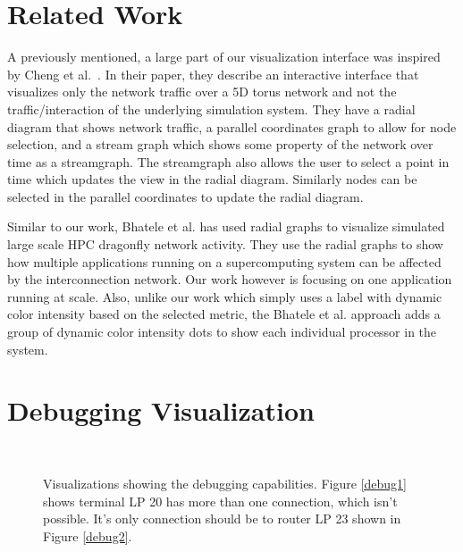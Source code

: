 \documentclass{acm_proc_article-sp}
\begin{document}
\section{Related Work}
A previously mentioned, a large part of our visualization interface was inspired by Cheng et al.~\cite{cheng}.  In their paper, they describe an interactive interface that visualizes only the network traffic over a 5D torus network and not the traffic/interaction of the underlying simulation system.  They have a radial diagram that shows network traffic, a parallel coordinates graph to allow for node selection, and a stream graph which shows some property of the network over time as a streamgraph.  The streamgraph also allows the user to select a point in time which updates the view in the radial diagram.  Similarly nodes can be selected in the parallel coordinates to update the radial diagram.

Similar to our work, Bhatele et al. \cite{DragonVis} has used radial graphs to visualize simulated large scale HPC dragonfly network activity. They use the radial graphs to show how multiple applications running on a supercomputing system can be affected by the interconnection network. Our work however is focusing on one application running at scale. Also, unlike our work which simply uses a label with dynamic color intensity based on the selected metric, the Bhatele et al. approach adds a group of dynamic color intensity dots to show each individual processor in the system. 

\section{Debugging Visualization}

\begin{figure}[!ht]
     \centering
     \\
          \caption{Visualizations showing the debugging capabilities. Figure \ref{debug1} shows terminal LP 20 has more than one connection, which isn't possible. It's only connection should be to router LP 23 shown in Figure \ref{debug2}. }
     \label{debug}
\end{figure}
\end{document}
